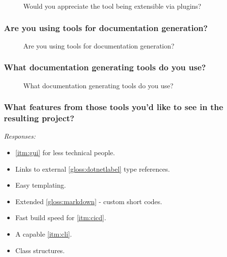 \begin{figure}[H]
    \centering
    \caption{Would you appreciate the tool being extensible via plugins?}
\end{figure}

\subsubsection*{Are you using tools for documentation generation?}

\begin{figure}[H]
    \centering
    \caption{Are you using tools for documentation generation?}
    \label{fig:qUsingToolsForDocGen}
\end{figure}

\subsubsection*{What documentation generating tools do you use?}

\begin{figure}[H]
    \centering
    \caption{What documentation generating tools do you use?}
\end{figure}

\subsubsection*{What features from those tools you'd like to see in the resulting project?}

\textit{Responses:}
\begin{itemize}
    \item \ref{itm:gui} for less technical people.
    \item Links to external \ref{gloss:dotnetlabel} type references.
    \item Easy templating.
    \item Extended \ref{gloss:markdown} - custom short codes.
    \item Fast build speed for \ref{itm:cicd}.
    \item A capable \ref{itm:cli}.
    \item Class structures.
\end{itemize}

